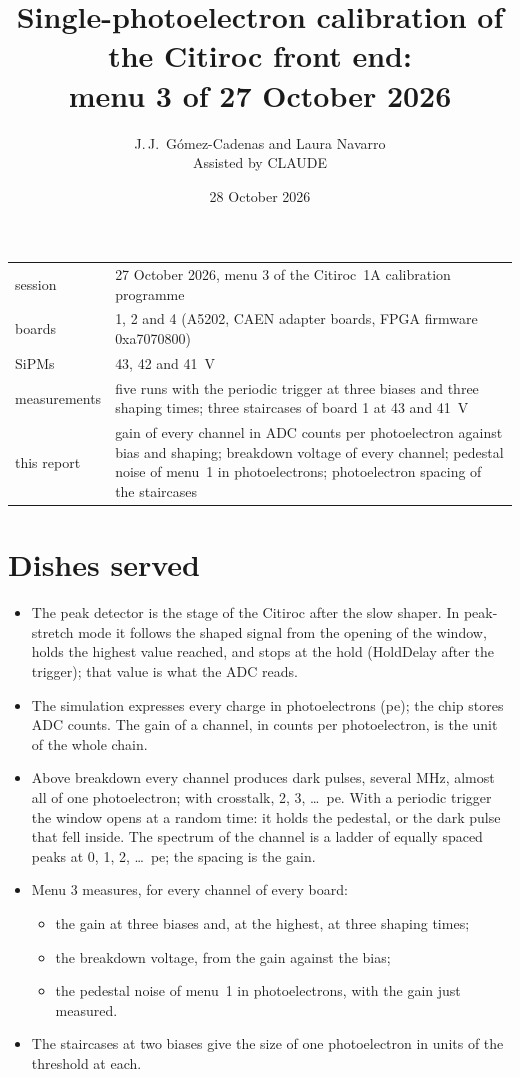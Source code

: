 \documentclass[11pt,a4paper]{article}
\title{Single-photoelectron calibration of the Citiroc front end:\\ menu 3 of 27 October 2026}
\author{J.\,J.~Gómez-Cadenas and Laura Navarro\\ \small Assisted by CLAUDE}
\date{28 October 2026}
\begin{document}
\maketitle

\begin{center}
\small
\begin{tabular}{lp{}}
\toprule
session & 27 October 2026, menu 3 of the Citiroc~1A calibration programme \\
boards & 1, 2 and 4 (A5202, CAEN adapter boards, FPGA firmware 0xa7070800) \\
SiPMs & 43, 42 and 41~V \\
measurements & five runs with the periodic trigger at three biases and three shaping times;
  three staircases of board 1 at 43 and 41~V \\
this report & gain of every channel in ADC counts per photoelectron against bias and
  shaping; breakdown voltage of every channel; pedestal noise of menu~1 in photoelectrons;
  photoelectron spacing of the staircases \\
\bottomrule
\end{tabular}
\end{center}

\section{Dishes served}

\begin{itemize}
\item The peak detector is the stage of the Citiroc after the slow shaper. In peak-stretch
  mode it follows the shaped signal from the opening of the window, holds the highest value
  reached, and stops at the hold (HoldDelay after the trigger); that value is what the ADC
  reads.
\item The simulation expresses every charge in photoelectrons (pe); the chip stores ADC
  counts. The gain of a channel, in counts per photoelectron, is the unit of the whole chain.
\item Above breakdown every channel produces dark pulses, several MHz, almost all of one
  photoelectron; with crosstalk, 2, 3, \ldots~pe. With a periodic trigger the window opens at
  a random time: it holds the pedestal, or the dark pulse that fell inside. The spectrum of
  the channel is a ladder of equally spaced peaks at 0, 1, 2, \ldots~pe; the spacing is the
  gain.
\item Menu 3 measures, for every channel of every board:
  \begin{itemize}
  \item the gain at three biases and, at the highest, at three shaping times;
  \item the breakdown voltage, from the gain against the bias;
  \item the pedestal noise of menu~1 in photoelectrons, with the gain just measured.
  \end{itemize}
\item The staircases at two biases give the size of one photoelectron in units of the
  threshold at each.
\end{itemize}
\end{document}

